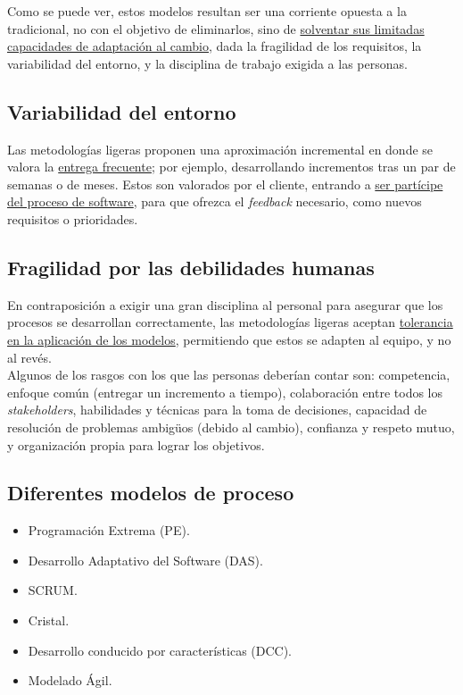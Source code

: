 Como se puede ver, estos modelos resultan ser una corriente opuesta a la tradicional, no con el objetivo de eliminarlos, sino de \uline{solventar sus limitadas capacidades de adaptación al cambio}, dada la fragilidad de los requisitos, la variabilidad del entorno, y la disciplina de trabajo exigida a las personas.\\

\subsection{Variabilidad del entorno}

Las metodologías ligeras proponen una aproximación incremental en donde se valora la \uline{entrega frecuente}; por ejemplo, desarrollando incrementos tras un par de semanas o de meses. Estos son valorados por el cliente, entrando a \uline{ser partícipe del proceso de software}, para que ofrezca el \textit{feedback} necesario, como nuevos requisitos o prioridades.

\subsection{Fragilidad por las debilidades humanas}

En contraposición a exigir una gran disciplina al personal para asegurar que los procesos se desarrollan correctamente, las metodologías ligeras aceptan \uline{tolerancia en la aplicación de los modelos}, permitiendo que estos se adapten al equipo, y no al revés.\\

Algunos de los rasgos con los que las personas deberían contar son: competencia, enfoque común (entregar un incremento a tiempo), colaboración entre todos los \textit{stakeholders}, habilidades y técnicas para la toma de decisiones, capacidad de resolución de problemas ambigüos (debido al cambio), confianza y respeto mutuo, y organización propia para lograr los objetivos.

\subsection{Diferentes modelos de proceso}

\begin{itemize}
   \item Programación Extrema (PE).
   \item Desarrollo Adaptativo del Software (DAS).
   \item SCRUM.
   \item Cristal.
   \item Desarrollo conducido por características (DCC).
   \item Modelado Ágil.
\end{itemize}

